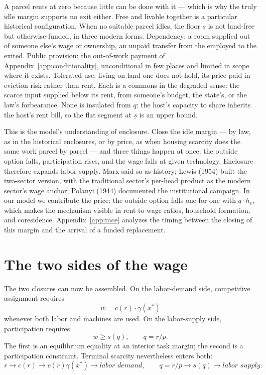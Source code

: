 \documentclass[12pt]{article}
\theoremstyle{plain}
\begin{document}
A parcel rents at zero because little can be done with it --- which is why the truly idle margin supports no exit either. Free and livable together is a particular historical configuration. When no suitable parcel idles, the floor $\underline{s}$ is not land-free but otherwise-funded, in three modern forms. Dependency: a room supplied out of someone else's wage or ownership, an unpaid transfer from the employed to the exited. Public provision: the out-of-work payment of Appendix~\ref{app:conditionality}, unconditional in few places and limited in scope where it exists. Tolerated use: living on land one does not hold, its price paid in eviction risk rather than rent. Each is a commons in the degraded sense: the scarce input supplied below its rent, from someone's budget, the state's, or the law's forbearance. None is insulated from $q$: the host's capacity to share inherits the host's rent bill, so the flat segment at $\underline{s}$ is an upper bound.

This is the model's understanding of enclosure. Close the idle margin --- by law, as in the historical enclosures, or by price, as when housing scarcity does the same work parcel by parcel --- and three things happen at once: the outside option falls, participation rises, and the wage falls at given technology. Enclosure therefore expands labor supply. Marx said so as history; Lewis (1954) built the two-sector version, with the traditional sector's per-head product as the modern sector's wage anchor; Polanyi (1944) documented the institutional campaign. In our model we contribute the price: the outside option falls one-for-one with $q\cdot h_e$, which makes the mechanism visible in rent-to-wage ratios, household formation, and coresidence. Appendix~\ref{app:race} analyzes the timing between the closing of this margin and the arrival of a funded replacement.

\section{The two sides of the wage}\label{sec:interval}

The two closures can now be assembled. On the labor-demand side, competitive
assignment requires
\[
w = c(r)\cdot\gamma(x^*)
\]
whenever both labor and machines are used. On the labor-supply side,
participation requires
\[
w \ge s(q), \qquad q=r/p.
\]
The first is an equilibrium equality at
an interior task margin; the second is a participation constraint. Terminal
scarcity nevertheless enters both:
\[
r
\to c(r)
\to c(r)\gamma(x^*)
\to \textit{labor demand},
\qquad
q=r/p
\to s(q)
\to \textit{labor supply}.
\]
\end{document}
